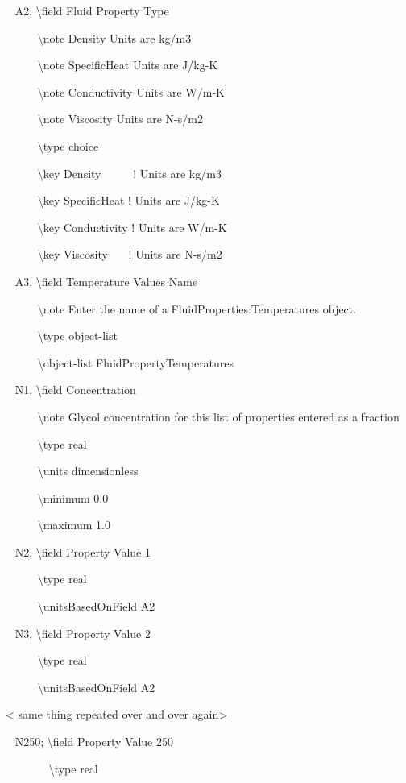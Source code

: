 ~ A2, \textbackslash{}field Fluid Property Type

~~ ~~~\textbackslash{}note Density Units are kg/m3

~~~~~ \textbackslash{}note SpecificHeat Units are J/kg-K

~~~~~ \textbackslash{}note Conductivity Units are W/m-K

~~~~~ \textbackslash{}note Viscosity Units are N-s/m2

~~~~~ \textbackslash{}type choice

~~~~~ \textbackslash{}key Density~~~~~ ! Units are kg/m3

~~~~~ \textbackslash{}key SpecificHeat ! Units are J/kg-K

~~~~~ \textbackslash{}key Conductivity ! Units are W/m-K

~~~~~ \textbackslash{}key Viscosity~~~ ! Units are N-s/m2

~ A3, \textbackslash{}field Temperature Values Name

~~~~~ \textbackslash{}note Enter the name of a FluidProperties:Temperatures object.

~~~~~ \textbackslash{}type object-list

~~~~~ \textbackslash{}object-list FluidPropertyTemperatures

~ N1, \textbackslash{}field Concentration

~~~~~ \textbackslash{}note Glycol concentration for this list of properties entered as a fraction

~~~~~ \textbackslash{}type real

~~~~~ \textbackslash{}units dimensionless

~~~~~ \textbackslash{}minimum 0.0

~~~~~ \textbackslash{}maximum 1.0

~ N2, \textbackslash{}field Property Value 1

~~~~~ \textbackslash{}type real

~~~~~ \textbackslash{}unitsBasedOnField A2

~ N3, \textbackslash{}field Property Value 2

~~~~~ \textbackslash{}type real

~~~~~ \textbackslash{}unitsBasedOnField A2

\textless{} same thing repeated over and over again\textgreater{}

~ N250; \textbackslash{}field Property Value 250

~~~~~~~ \textbackslash{}type real

